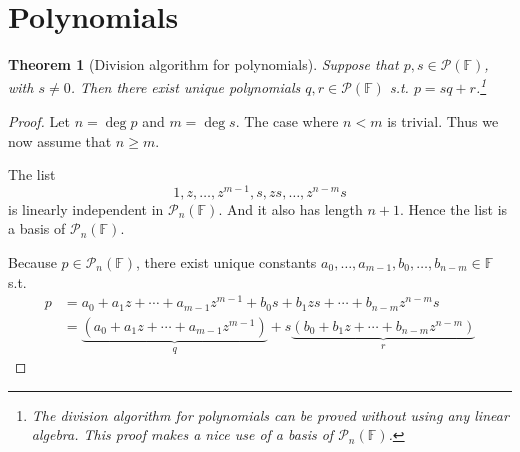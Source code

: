 \documentclass{tufte-handout}
\theoremstyle{plain} %
\newtheorem{thm}{Theorem}
\theoremstyle{definition}
\theoremstyle{remark}
\newcommand{\bra}[1]{\mathopen{}\left(#1\right)}
\newcommand{\F}{\mathbb{F}}
\newcommand{\mP}{\mathcal{P}}
\begin{document}
\section{Polynomials}
\begin{thm}[Division algorithm for polynomials]
	Suppose that $p,s\in\mP(\F)$, with $s\neq0$. Then there exist unique polynomials $q,r\in\mP(\F)$ s.t. $p=sq+r$.\footnote{The division algorithm for polynomials can be proved without using any linear algebra. This proof makes a nice use of a basis of $\mP_n(\F)$.}
\end{thm}
\begin{proof}
	Let $n=\deg p$ and $m=\deg s$. The case where $n<m$ is trivial. Thus we now assume that $n\geq m$.

	The list
	\[1,z,\dots,z^{m-1},s,zs,\dots,z^{n-m}s\]
	is linearly independent in $\mP_n(\F)$. And it also has length $n+1$. Hence the list is a basis of $\mP_n(\F)$.

	Because $p\in\mP_n(\F)$, there exist unique constants $a_0,\dots,a_{m-1},b_0,\dots,b_{n-m}\in\F$ s.t.
	\begin{align*}
		p&=a_0+a_1z+\cdots+a_{m-1}z^{m-1}+b_0s+b_1zs+\cdots+b_{n-m}z^{n-m}s\\
		&=\underbrace{\bra{a_0+a_1z+\cdots+a_{m-1}z^{m-1}}}_q+s\underbrace{\bra{b_0+b_1z+\cdots+b_{n-m}z^{n-m}}}_r
	\end{align*}
\end{proof}
\end{document}
